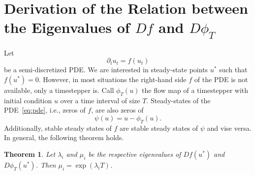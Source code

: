 \documentclass{article}
\newtheorem{theorem}{Theorem}[section]
\begin{document}
\section{Derivation of the Relation between the Eigenvalues of $Df$ and $D\phi_T$} \label{app:eigenvalues}
Let 
	\begin{equation} \label{eq:pde}
		\partial_t u_t = f\left(u_t\right)
	\end{equation}
	be a semi-discretized PDE. We are interested in steady-state points $u^*$ such that $f(u^*)=0$. However, in most situations the right-hand side $f$ of the PDE is not available, only a timestepper is. Call $\phi_T(u)$ the flow map of a timestepper with initial condition $u$ over a time interval of size $T$. Steady-states of the PDE~\eqref{eq:pde}, i.e., zeros of $f$, are also zeros of
	\begin{equation}
		\psi(u) = u - \phi_T(u).
	\end{equation}
	Additionally, stable steady states of $f$ are stable steady states of $\psi$ and vise versa. In general, the following theorem holds.
	\begin{theorem}
		Let $\lambda_i$ and $\mu_i$ be the respective eigenvalues of $D f(u^*)$ and $D \phi_T(u^*)$. Then $\mu_i = \exp\left(\lambda_i T\right)$. 
	\end{theorem}
\end{document}
